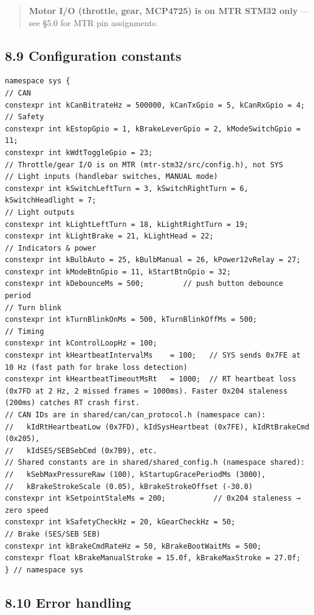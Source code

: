 \begin{quote}
\textbf{Motor I/O (throttle, gear, MCP4725) is on MTR STM32 only} --- see §5.0
for MTR pin assignments.
\end{quote}

\subsection{8.9 Configuration constants}\label{configuration-constants-1}

\begin{verbatim}
namespace sys {
// CAN
constexpr int kCanBitrateHz = 500000, kCanTxGpio = 5, kCanRxGpio = 4;
// Safety
constexpr int kEstopGpio = 1, kBrakeLeverGpio = 2, kModeSwitchGpio = 11;
constexpr int kWdtToggleGpio = 23;
// Throttle/gear I/O is on MTR (mtr-stm32/src/config.h), not SYS
// Light inputs (handlebar switches, MANUAL mode)
constexpr int kSwitchLeftTurn = 3, kSwitchRightTurn = 6, kSwitchHeadlight = 7;
// Light outputs
constexpr int kLightLeftTurn = 18, kLightRightTurn = 19;
constexpr int kLightBrake = 21, kLightHead = 22;
// Indicators & power
constexpr int kBulbAuto = 25, kBulbManual = 26, kPower12vRelay = 27;
constexpr int kModeBtnGpio = 11, kStartBtnGpio = 32;
constexpr int kDebounceMs = 500;         // push button debounce period
// Turn blink
constexpr int kTurnBlinkOnMs = 500, kTurnBlinkOffMs = 500;
// Timing
constexpr int kControlLoopHz = 100;
constexpr int kHeartbeatIntervalMs    = 100;   // SYS sends 0x7FE at 10 Hz (fast path for brake loss detection)
constexpr int kHeartbeatTimeoutMsRt   = 1000;  // RT heartbeat loss (0x7FD at 2 Hz, 2 missed frames = 1000ms). Faster 0x204 staleness (200ms) catches RT crash first.
// CAN IDs are in shared/can/can_protocol.h (namespace can):
//   kIdRtHeartbeatLow (0x7FD), kIdSysHeartbeat (0x7FE), kIdRtBrakeCmd (0x205),
//   kIdSES/SEBSebCmd (0x7B9), etc.
// Shared constants are in shared/shared_config.h (namespace shared):
//   kSebMaxPressureRaw (100), kStartupGracePeriodMs (3000),
//   kBrakeStrokeScale (0.05), kBrakeStrokeOffset (-30.0)
constexpr int kSetpointStaleMs = 200;           // 0x204 staleness → zero speed
constexpr int kSafetyCheckHz = 20, kGearCheckHz = 50;
// Brake (SES/SEB SEB)
constexpr int kBrakeCmdRateHz = 50, kBrakeBootWaitMs = 500;
constexpr float kBrakeManualStroke = 15.0f, kBrakeMaxStroke = 27.0f;
} // namespace sys
\end{verbatim}

\subsection{8.10 Error handling}\label{error-handling-1}

